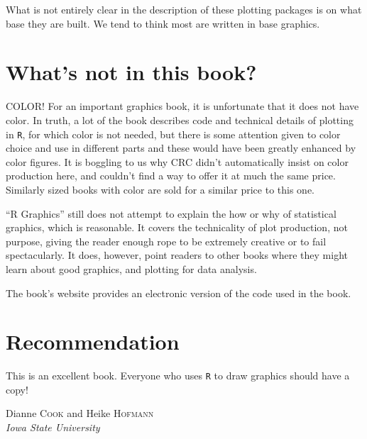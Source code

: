 \documentclass[12pt]{article}
\begin{document}
\noindent What is not entirely clear in the description of these plotting packages is on what base they are built. We tend to think  most are written in base graphics.

\section{What's not in this book?} 

COLOR! For an important graphics book, it is unfortunate that it does not
have color. In truth, a lot of the book describes code and technical
details of plotting in \texttt{R}, for which color is not needed, but there is some attention given to color choice and use in
different parts and these would have been greatly enhanced by color
figures. It is boggling to us why CRC didn't automatically insist on color
production here, and couldn't find a way to offer it at much the same
price. Similarly sized books with color are sold for a similar price
to this one.

``R Graphics'' still does not attempt to explain the how or why of
statistical graphics, which is reasonable.  It covers the technicality
of plot production, not purpose, giving the reader enough rope to be
extremely creative or to fail spectacularly. It does, however, point
readers to other books where they might learn about good graphics, and
plotting for data analysis.

The book's website provides an electronic version of
the code used in the book.

\section{Recommendation}

This is an excellent book. Everyone who uses \texttt{R} to draw graphics should have a copy! 

\begin{flushright}\def\baselinestretch{1}
Dianne \textsc{Cook} and Heike \textsc{Hofmann} \\ 
\emph{Iowa State University}
\end{flushright}


\end{document}
